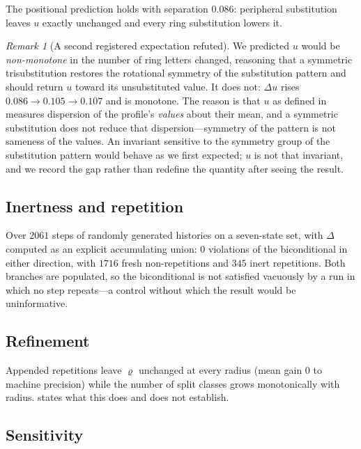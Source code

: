 \documentclass[11pt,a4paper]{article}
\theoremstyle{clthm}
\theoremstyle{definition}
\theoremstyle{remark}
\newtheorem{remark}[theorem]{Remark}
\newcommand{\circu}{\varrho}
\newcommand{\unif}{u}
\newcommand{\Dl}{\Delta}
\begin{document}
The positional prediction holds with separation $0.086$: peripheral
substitution leaves $\unif$ exactly unchanged and every ring substitution
lowers it.

\begin{remark}[A second registered expectation refuted]
\label{rem:mono-refuted}
We predicted $\unif$ would be \emph{non-monotone} in the number of ring
letters changed, reasoning that a symmetric trisubstitution restores the
rotational symmetry of the substitution pattern and should return $\unif$
toward its unsubstituted value. It does not: $\Delta\unif$ rises
$0.086\to0.105\to0.107$ and is monotone. The reason is that $\unif$ as
defined in  measures dispersion of the profile's
\emph{values} about their mean, and a symmetric substitution does not
reduce that dispersion---symmetry of the pattern is not sameness of the
values. An invariant sensitive to the symmetry group of the substitution
pattern would behave as we first expected; $\unif$ is not that invariant,
and we record the gap rather than redefine the quantity after seeing the
result.
\end{remark}

\subsection{Inertness and repetition}

Over $2061$ steps of randomly generated histories on a seven-state set,
with $\Dl$ computed as an explicit accumulating union: $0$ violations of
the biconditional in either direction, with $1716$ fresh non-repetitions
and $345$ inert repetitions. Both branches are populated, so the
biconditional is not satisfied vacuously by a run in which no step
repeats---a control without which the result would be uninformative.

\subsection{Refinement}
\label{sec:val-refine}

Appended repetitions leave $\circu$ unchanged at every radius (mean gain
$0$ to machine precision) while the number of split classes grows
monotonically with radius.  states what this does
and does not establish.

\subsection{Sensitivity}
\end{document}
